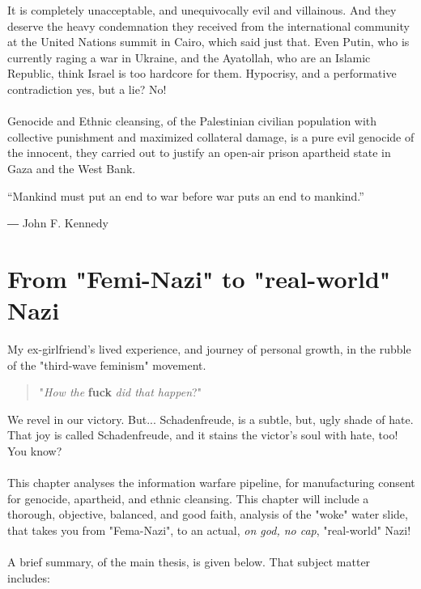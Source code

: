 \documentclass[16pt,openany,oneside]{book}
\begin{document}
It is completely unacceptable, and unequivocally evil and villainous. And they deserve the heavy condemnation they received from the international community at the United Nations summit in Cairo, which said just that. Even Putin, who is currently raging a war in Ukraine, and the Ayatollah, who are an Islamic Republic, think Israel is too hardcore for them. Hypocrisy, and a performative contradiction yes, but a lie? No!
\\\\
Genocide and Ethnic cleansing, of the Palestinian civilian population with collective punishment and maximized collateral damage, is a pure evil genocide of the innocent, they carried out to justify an open-air prison apartheid state in Gaza and the West Bank.

\epigraph{“Mankind must put an end to war before war puts an end to mankind.”
}{― John F. Kennedy}

\chapter{From "Femi-Nazi" to "real-world" Nazi }

My ex-girlfriend's lived experience, and journey of personal growth, in the rubble of the "third-wave feminism" movement.

\begin{quote}
    "\textit{How the} \textbf{fuck} \textit{did that happen}?"
\end{quote}

We revel in our victory. But... Schadenfreude, is a subtle, but, ugly shade of hate. That joy is called Schadenfreude, and it stains the victor's soul with hate, too! You know? 
\\\\
This chapter analyses the information warfare pipeline, for manufacturing consent for genocide, apartheid, and ethnic cleansing. This chapter will include a thorough, objective, balanced, and good faith, analysis of the "woke" water slide, that takes you from "Fema-Nazi", to an actual, \emph{on god, no cap}, "real-world" Nazi!
\\\\
A brief summary, of the main thesis, is given below. That subject matter includes:
\end{document}
